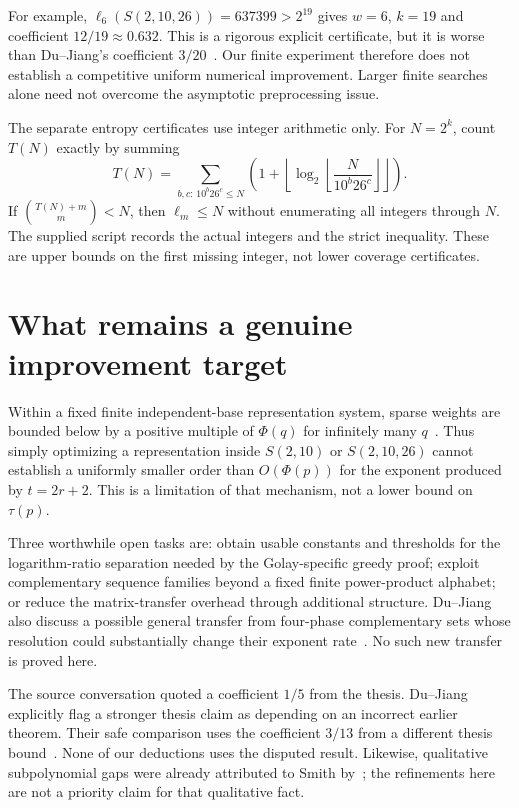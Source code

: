 \documentclass[11pt]{article}
\newcommand{\ph}{\Phi}
\begin{document}
For example, $\ell_6(S(2,10,26))=637399>2^{19}$ gives $w=6$, $k=19$
and coefficient $12/19\approx0.632$. This is a rigorous explicit
certificate, but it is worse than Du--Jiang's coefficient $3/20$~\cite{DJ}.
Our finite experiment therefore does not establish a competitive uniform
numerical improvement. Larger finite searches alone need not overcome
the asymptotic preprocessing issue.

The separate entropy certificates use integer arithmetic only. For
$N=2^k$, count $T(N)$ exactly by summing
\[
T(N)=\sum_{b,c:\,10^b26^c\le N}
\left(1+\left\lfloor\log_2\left\lfloor
\frac{N}{10^b26^c}\right\rfloor\right\rfloor\right).
\]
If $\binom{T(N)+m}{m}<N$, then $\ell_m\le N$ without enumerating all
integers through $N$. The supplied script records the actual integers
and the strict inequality. These are upper bounds on the first missing
integer, not lower coverage certificates.

\section{What remains a genuine improvement target}
Within a fixed finite independent-base representation system, sparse
weights are bounded below by a positive multiple of $\ph(q)$ for
infinitely many $q$~\cite{KSW}. Thus simply optimizing a representation
inside $S(2,10)$ or $S(2,10,26)$ cannot establish a uniformly smaller
order than $O(\ph(p))$ for the exponent produced by $t=2r+2$.
This is a limitation of that mechanism, not a lower bound on $\tau(p)$.

Three worthwhile open tasks are: obtain usable constants and thresholds
for the logarithm-ratio separation needed by the Golay-specific greedy
proof; exploit complementary sequence families beyond a fixed finite
power-product alphabet; or reduce the matrix-transfer overhead through
additional structure. Du--Jiang also discuss a possible general transfer
from four-phase complementary sets whose resolution could substantially
change their exponent rate~\cite[conclusion]{DJ}. No such new transfer
is proved here.

The source conversation quoted a coefficient $1/5$ from the thesis.
Du--Jiang explicitly flag a stronger thesis claim as depending on an
incorrect earlier theorem. Their safe comparison uses the coefficient
$3/13$ from a different thesis bound~\cite[introduction]{DJ}. None of
our deductions uses the disputed result. Likewise, qualitative
subpolynomial gaps were already attributed to Smith by~\cite{BOS};
the refinements here are not a priority claim for that qualitative fact.
\end{document}
